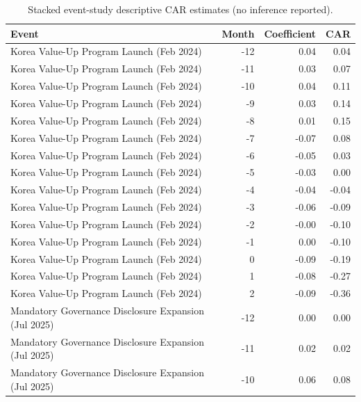 \begin{table}
\caption{Stacked event-study descriptive CAR estimates (no inference reported).}
\label{tab:event_study_coefs}
\begin{tabular}{lrrr}
\toprule
Event & Month & Coefficient & CAR \\
\midrule
Korea Value-Up Program Launch (Feb 2024) & -12 & 0.04 & 0.04 \\
Korea Value-Up Program Launch (Feb 2024) & -11 & 0.03 & 0.07 \\
Korea Value-Up Program Launch (Feb 2024) & -10 & 0.04 & 0.11 \\
Korea Value-Up Program Launch (Feb 2024) & -9 & 0.03 & 0.14 \\
Korea Value-Up Program Launch (Feb 2024) & -8 & 0.01 & 0.15 \\
Korea Value-Up Program Launch (Feb 2024) & -7 & -0.07 & 0.08 \\
Korea Value-Up Program Launch (Feb 2024) & -6 & -0.05 & 0.03 \\
Korea Value-Up Program Launch (Feb 2024) & -5 & -0.03 & 0.00 \\
Korea Value-Up Program Launch (Feb 2024) & -4 & -0.04 & -0.04 \\
Korea Value-Up Program Launch (Feb 2024) & -3 & -0.06 & -0.09 \\
Korea Value-Up Program Launch (Feb 2024) & -2 & -0.00 & -0.10 \\
Korea Value-Up Program Launch (Feb 2024) & -1 & 0.00 & -0.10 \\
Korea Value-Up Program Launch (Feb 2024) & 0 & -0.09 & -0.19 \\
Korea Value-Up Program Launch (Feb 2024) & 1 & -0.08 & -0.27 \\
Korea Value-Up Program Launch (Feb 2024) & 2 & -0.09 & -0.36 \\
Mandatory Governance Disclosure Expansion (Jul 2025) & -12 & 0.00 & 0.00 \\
Mandatory Governance Disclosure Expansion (Jul 2025) & -11 & 0.02 & 0.02 \\
Mandatory Governance Disclosure Expansion (Jul 2025) & -10 & 0.06 & 0.08 \\

\end{tabular}
\end{table}
